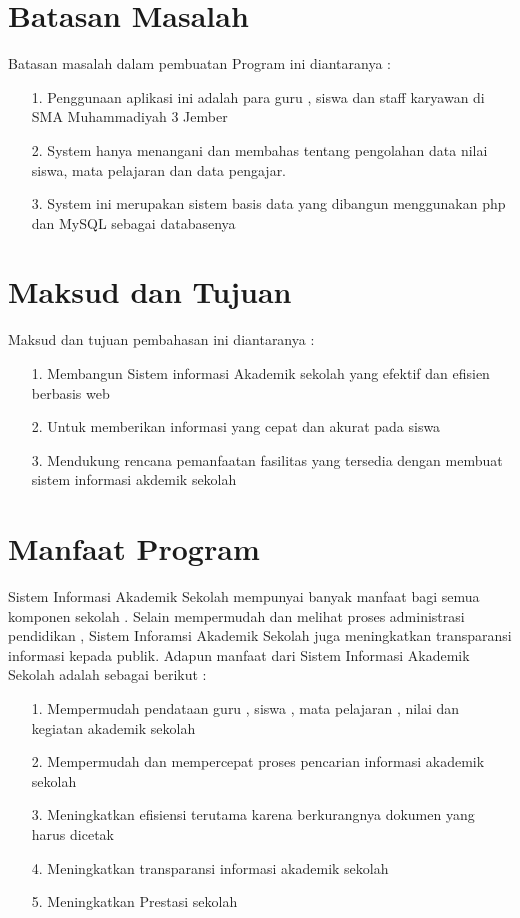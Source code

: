 \documentclass{jtetiproposalskripsi}
\begin{document}
\section{Batasan Masalah}
Batasan masalah dalam pembuatan Program ini diantaranya :
\begin{itemize}


\item[1.]	Penggunaan aplikasi ini adalah para guru , siswa dan staff karyawan di SMA Muhammadiyah 3 Jember
\item[2.]	System hanya menangani dan membahas tentang pengolahan data nilai siswa, mata pelajaran dan data pengajar.
\item[3.] System ini merupakan sistem basis data yang dibangun menggunakan php dan MySQL sebagai databasenya 
\end{itemize}

\section{Maksud dan Tujuan}
Maksud dan tujuan pembahasan ini diantaranya :
\begin{itemize}

\item[1.]Membangun Sistem informasi Akademik sekolah yang efektif dan efisien berbasis web
\item[2.]Untuk memberikan informasi yang cepat dan akurat pada siswa
\item[3.]Mendukung rencana pemanfaatan fasilitas yang tersedia dengan membuat sistem informasi akdemik sekolah
\end{itemize}




\section{Manfaat Program}
Sistem Informasi Akademik Sekolah mempunyai banyak manfaat bagi semua komponen sekolah . Selain mempermudah dan melihat proses administrasi pendidikan , Sistem Inforamsi Akademik Sekolah juga meningkatkan transparansi informasi kepada publik.
Adapun manfaat dari Sistem Informasi Akademik Sekolah adalah sebagai berikut :
\begin{itemize}


\item[1.] Mempermudah pendataan guru , siswa , mata pelajaran , nilai dan kegiatan akademik sekolah
\item[2.]	Mempermudah dan mempercepat proses pencarian informasi akademik sekolah
\item[3.]	Meningkatkan efisiensi terutama karena berkurangnya  dokumen yang harus dicetak 
\item[4.]	Meningkatkan transparansi informasi akademik sekolah
\item[5.]	Meningkatkan Prestasi sekolah
\end{itemize}
\end{document}
